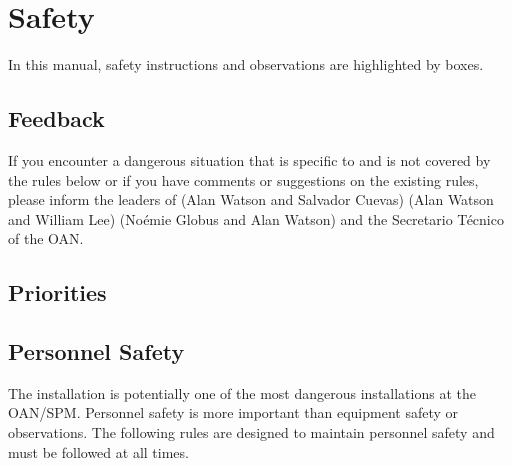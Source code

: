 \chapter{Safety}
\label{chapter:safety}

In this manual, safety instructions and observations are highlighted by boxes.
\section{Feedback}

If you encounter a dangerous situation that is specific to {\projectname} and is not covered by the rules below or if you have comments or suggestions on the existing rules, please inform the leaders of {\projectname}
\ifcoatli
(Alan Watson and Salvador Cuevas)
\fi
\ifddoti
(Alan Watson and William Lee)
\fi
\ifquetzalcoatl
(Noémie Globus and Alan Watson)
\fi
and the Secretario Técnico of the OAN.

\section{Priorities}


\section{Personnel Safety}
\label{section:personnel-safety}

The {\projectname} installation is potentially one of the most dangerous installations at the OAN/SPM. Personnel safety is more important than equipment safety or observations. The following  rules are designed to maintain personnel safety and must be followed at all times.




